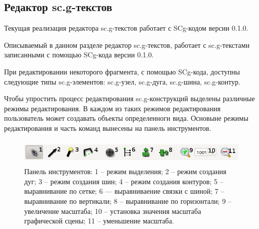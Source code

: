 
\subsection{Редактор sc.g-текстов}

Текущая реализация редактора sc.g-текстов работает с SCg-кодом версии 0.1.0.

Описываемый в данном разделе редактор sc.g-текстов, работает с sc.g-текстами записанными с помощью SCg-кода версии 0.1.0.


При редактировании некоторого фрагмента, с помощью SCg-кода, доступны следующие типы sc.g-элементов: {\sf sc.g-узел}, {\sf sc.g-дуга}, {\sf sc.g-шина}, {\sf sc.g-контур}.
 
Чтобы упростить процесс редактирования sc.g-конструкций выделены различные режимы редактирования. В каждом из таких режимов редактирования пользователь может создавать объекты определенноги вида. Основыне режимы редактирования и часть команд вынесены на панель инструментов. 
\begin{figure}[h]
	\includegraphics[width=15.77cm, height=1.27cm]{../images/scgtoolbar.png}
	\caption{Панель инструментов: 1 – режим выделения; 2 – режим создания дуг; 3 – режим создания шин; 4 – режим создания контуров; 5 – выравнивание по сетке; 6 — выравниваение связки с шиной; 
7 – выравнивание по вертикали; 8 – выравнивание по горизонтали; 9 – увеличение масштаба; 10 – установка значения масштаба графической сцены; 11 – уменьшение масштаба.}
	\label{scgtoolbar}
\end{figure}

